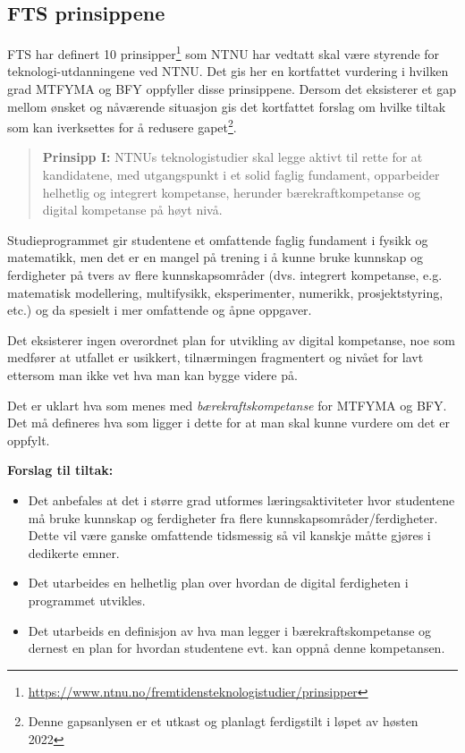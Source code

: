 \subsection{FTS prinsippene}
\label{sec:fts-principles}
FTS har definert 10 prinsipper\footnote{\url{https://www.ntnu.no/fremtidensteknologistudier/prinsipper}} som NTNU har vedtatt skal være styrende for teknologi-utdanningene ved NTNU. Det gis her en kortfattet vurdering i hvilken grad MTFYMA og BFY oppfyller disse prinsippene. Dersom det eksisterer et gap mellom ønsket og nåværende situasjon gis det kortfattet forslag om hvilke tiltak som kan iverksettes for å redusere gapet\footnote{Denne gapsanlysen er et utkast og planlagt ferdigstilt i løpet av høsten 2022}.

\begin{quote}
	\textbf{Prinsipp I:} NTNUs teknologistudier skal legge aktivt til rette for at kandidatene, med utgangspunkt i et solid faglig fundament, opparbeider helhetlig og integrert kompetanse, herunder bærekraftkompetanse og digital kompetanse på høyt nivå.
\end{quote}

Studieprogrammet gir studentene et omfattende faglig fundament i fysikk og matematikk, men det er en mangel på trening i å kunne bruke kunnskap og ferdigheter på tvers av flere kunnskapsområder (dvs. integrert kompetanse, e.g. matematisk modellering, multifysikk, eksperimenter, numerikk, prosjektstyring, etc.) og da spesielt i mer omfattende og åpne oppgaver.

Det eksisterer ingen overordnet plan for utvikling av digital kompetanse, noe som medfører at utfallet er usikkert, tilnærmingen fragmentert og nivået for lavt ettersom man ikke vet hva man kan bygge videre på.

Det er uklart hva som menes med \emph{bærekraftskompetanse} for MTFYMA og BFY. Det må defineres hva som ligger i dette for at man skal kunne vurdere om det er oppfylt.

\textbf{Forslag til tiltak:}
\begin{itemize}
	\item Det anbefales at det i større grad utformes læringsaktiviteter hvor studentene må bruke kunnskap og ferdigheter fra flere kunnskapsområder/ferdigheter. Dette vil være ganske omfattende tidsmessig så vil kanskje måtte gjøres i dedikerte emner.
	\item Det utarbeides en helhetlig plan over hvordan de digital ferdigheten i programmet utvikles.
	\item Det utarbeids en definisjon av hva man legger i bærekraftskompetanse og dernest en plan for hvordan studentene evt. kan oppnå denne kompetansen.
\end{itemize}

